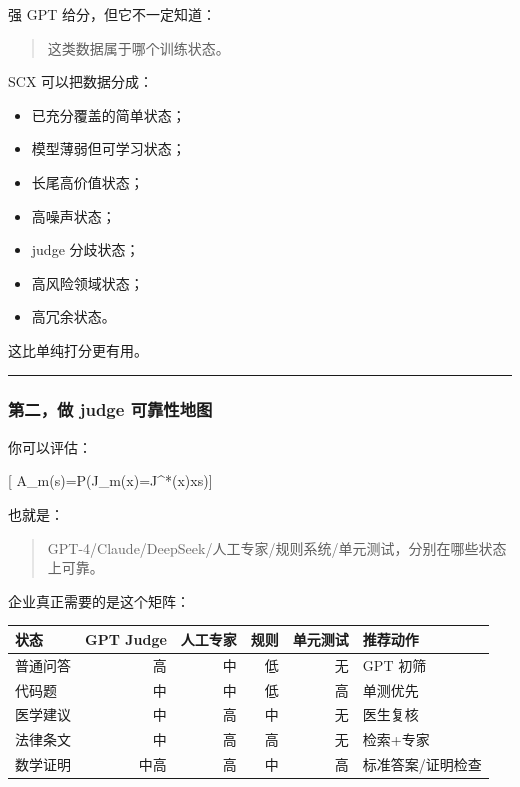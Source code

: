 \documentclass[
  12pt,
]{ctexart}
\providecommand{\tightlist}{%
  \setlength{\itemsep}{0pt}\setlength{\parskip}{0pt}}
\begin{document}
强 GPT 给分，但它不一定知道：

\begin{quote}
这类数据属于哪个训练状态。
\end{quote}

SCX 可以把数据分成：

\begin{itemize}
\tightlist
\item
  已充分覆盖的简单状态；
\item
  模型薄弱但可学习状态；
\item
  长尾高价值状态；
\item
  高噪声状态；
\item
  judge 分歧状态；
\item
  高风险领域状态；
\item
  高冗余状态。
\end{itemize}

这比单纯打分更有用。

\begin{center}\rule{0.5\linewidth}{0.5pt}\end{center}

\subsubsection{第二，做 judge
可靠性地图}\label{ux7b2cux4e8cux505a-judge-ux53efux9760ux6027ux5730ux56fe}

你可以评估：

{[} A\_m(s)=P(J\_m(x)=J\^{}*(x)\mid x\in s){]}

也就是：

\begin{quote}
GPT-4/Claude/DeepSeek/人工专家/规则系统/单元测试，分别在哪些状态上可靠。
\end{quote}

企业真正需要的是这个矩阵：

\begin{longtable}[]{@{}lrrrrl@{}}
\toprule\noalign{}
状态 & GPT Judge & 人工专家 & 规则 & 单元测试 & 推荐动作 \\
\midrule\noalign{}
\endhead
\bottomrule\noalign{}
\endlastfoot
普通问答 & 高 & 中 & 低 & 无 & GPT 初筛 \\
代码题 & 中 & 中 & 低 & 高 & 单测优先 \\
医学建议 & 中 & 高 & 中 & 无 & 医生复核 \\
法律条文 & 中 & 高 & 高 & 无 & 检索+专家 \\
数学证明 & 中高 & 高 & 中 & 高 & 标准答案/证明检查 \\
\end{longtable}
\end{document}
